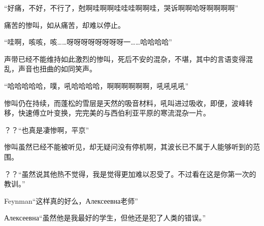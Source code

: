 \documentclass{article}
\begin{document}









“好痛，不好，不行了，尅啊哇啊啊哇哇哇啊啊哇，哭诉啊啊哈呀啊啊啊啊”

痛苦的惨叫，如从痛苦，却难以停止。

“哇啊，咳咳，咳……呀呀呀呀呀呀呀呀一……哈哈哈哈”

声带已经不能维持如此激烈的惨叫，死后不安的混杂，不堪，其中的言语变得混乱，声音也扭曲的如同笑声。

“哈哈哈哈哈，噗，吼哈哈哈哈，啊啊啊啊啊啊，吼吼吼吼”

惨叫仍在持续，而蓬松的雪层是天然的吸音材料，吼叫进过吸收，即便，波峰转移，快速傅立叶变换，完完美的与西伯利亚平原的寒流混杂一片。

？？“也真是凄惨啊，平京”

惨叫虽然已经不能被听见，却无疑问没有停机啊，其波长已不属于人能够听到的范围。

？？“虽然说其他热不觉得，我是觉得更加难以忍受了。不过看在这是你第一次的教训。”

Feynman“这样真的好么，Алексеевна老师”

Алексеевна“虽然他是我最好的学生，但他还是犯了人类的错误。”
\end{document}
